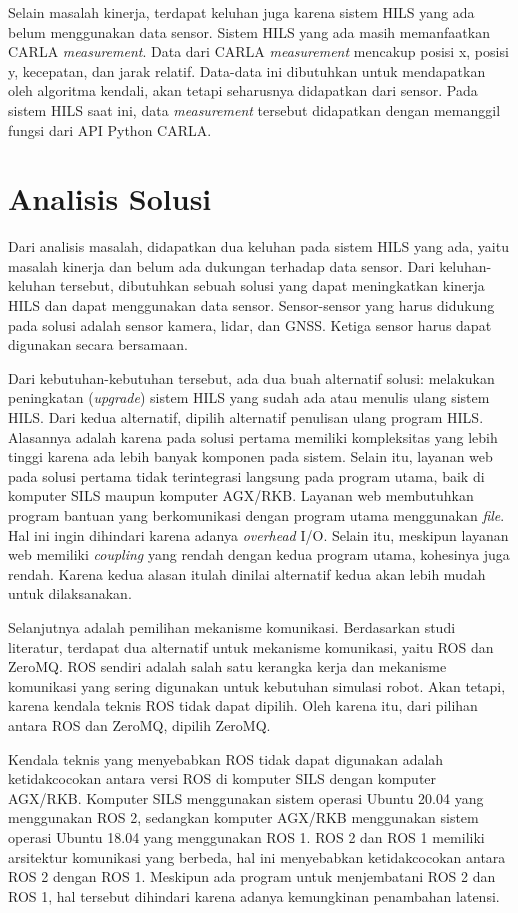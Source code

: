Selain masalah kinerja, terdapat keluhan juga karena sistem HILS yang ada belum
menggunakan data sensor. Sistem HILS yang ada masih memanfaatkan CARLA
\textit{measurement}. Data dari CARLA \textit{measurement} mencakup posisi x,
posisi y, kecepatan, dan jarak relatif. Data-data ini dibutuhkan untuk
mendapatkan oleh algoritma kendali, akan tetapi seharusnya didapatkan dari
sensor. Pada sistem HILS saat ini, data \textit{measurement} tersebut didapatkan
dengan memanggil fungsi dari API Python CARLA.

\section{Analisis Solusi}

Dari analisis masalah, didapatkan dua keluhan pada sistem HILS yang ada, yaitu
masalah kinerja dan belum ada dukungan terhadap data sensor. Dari
keluhan-keluhan tersebut, dibutuhkan sebuah solusi yang dapat meningkatkan
kinerja HILS dan dapat menggunakan data sensor. Sensor-sensor yang harus
didukung pada solusi adalah sensor kamera, lidar, dan GNSS. Ketiga sensor harus
dapat digunakan secara bersamaan.

Dari kebutuhan-kebutuhan tersebut, ada dua buah alternatif solusi: melakukan
peningkatan (\textit{upgrade}) sistem HILS yang sudah ada atau menulis ulang
sistem HILS. Dari kedua alternatif, dipilih alternatif penulisan ulang program
HILS. Alasannya adalah karena pada solusi pertama memiliki kompleksitas yang
lebih tinggi karena ada lebih banyak komponen pada sistem. Selain itu, layanan
web pada solusi pertama tidak terintegrasi langsung pada program utama, baik di
komputer SILS maupun komputer AGX/RKB. Layanan web membutuhkan program bantuan
yang berkomunikasi dengan program utama menggunakan \textit{file}. Hal ini ingin
dihindari karena adanya \textit{overhead} I/O. Selain itu, meskipun layanan web
memiliki \textit{coupling} yang rendah dengan kedua program utama, kohesinya
juga rendah. Karena kedua alasan itulah dinilai alternatif kedua akan lebih
mudah untuk dilaksanakan.

Selanjutnya adalah pemilihan mekanisme komunikasi. Berdasarkan studi literatur,
terdapat dua alternatif untuk mekanisme komunikasi, yaitu ROS dan ZeroMQ. ROS
sendiri adalah salah satu kerangka kerja dan mekanisme komunikasi yang sering
digunakan untuk kebutuhan simulasi robot. Akan tetapi, karena kendala teknis ROS
tidak dapat dipilih. Oleh karena itu, dari pilihan antara ROS dan ZeroMQ,
dipilih ZeroMQ.

Kendala teknis yang menyebabkan ROS tidak dapat digunakan adalah ketidakcocokan
antara versi ROS di komputer SILS dengan komputer AGX/RKB. Komputer SILS
menggunakan sistem operasi Ubuntu 20.04 yang menggunakan ROS 2, sedangkan
komputer AGX/RKB menggunakan sistem operasi Ubuntu 18.04 yang menggunakan ROS 1.
ROS 2 dan ROS 1 memiliki arsitektur komunikasi yang berbeda, hal ini menyebabkan
ketidakcocokan antara ROS 2 dengan ROS 1. Meskipun ada program untuk
menjembatani ROS 2 dan ROS 1, hal tersebut dihindari karena adanya kemungkinan
penambahan latensi.

